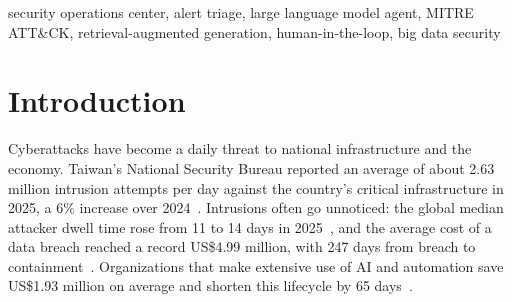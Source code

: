 \documentclass[conference]{IEEEtran}
\newcommand{\TBD}{\textcolor{red}{\textbf{[TBD]}}}
\begin{document}
\begin{abstract}
Security operations centers (SOCs) face a growing flood of alerts, and
the speed of triage directly determines the cost of a breach.
However, machine-learning (ML) triage models say little about where an
alert sits in an attack chain, large language model (LLM) agents miss
many attacks and close cases too early when evidence is missing, and
automation makes analysts complacent.
To address these challenges, we propose the AI SOC Analyst Agent, which
classifies incidents as true positive, benign positive, or false
positive and explicitly decides when a human analyst must take over.
The design combines a ReAct-style LLM planner with a rule-based
evidence-sufficiency test based on the assume-breach principle, a
gradient-boosted decision tree with SHAP explanations,
retrieval-augmented MITRE ATT\&CK and NIST incident-response knowledge,
and an evidence-fusion algorithm that escalates on low confidence,
model conflict, high-risk kill-chain patterns, or insufficient
evidence.
To evaluate the scheme, we conduct experiments on Microsoft GUIDE,
with 707{,}108 analyst-labeled training incidents from 5{,}769
organizations, and on ExCyTIn-Bench, comparing against majority-class,
detector-rule, ML-only, and LLM-only baselines.
\TBD{} Results show that \dots{} (state the measured TP miss rate and
escalation rate from Section~IV).
\end{abstract}

\begin{IEEEkeywords}
security operations center, alert triage, large language model agent,
MITRE ATT\&CK, retrieval-augmented generation, human-in-the-loop,
big data security
\end{IEEEkeywords}

\section{Introduction}\label{sec:intro}

Cyberattacks have become a daily threat to national infrastructure and
the economy. Taiwan's National Security Bureau reported an average of
about 2.63 million intrusion attempts per day against the country's
critical infrastructure in 2025, a 6\% increase over 2024~\cite{nsb2026}.
Intrusions often go unnoticed: the global median attacker dwell time
rose from 11 to 14 days in 2025~\cite{mtrends2026}, and the average
cost of a data breach reached a record US\$4.99 million, with 247 days
from breach to containment~\cite{ibm2026}. Organizations that make
extensive use of AI and automation save US\$1.93 million on average and
shorten this lifecycle by 65 days~\cite{ibm2026}.
\end{document}
